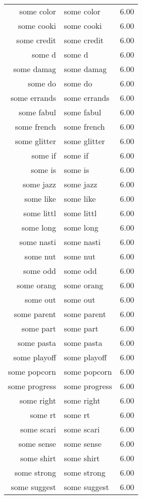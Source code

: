 \begin{table}[ht]
\begin{tabular}{rlr}
  some color & some color & 6.00 \\ 
  some cooki & some cooki & 6.00 \\ 
  some credit & some credit & 6.00 \\ 
  some d & some d & 6.00 \\ 
  some damag & some damag & 6.00 \\ 
  some do & some do & 6.00 \\ 
  some errands & some errands & 6.00 \\ 
  some fabul & some fabul & 6.00 \\ 
  some french & some french & 6.00 \\ 
  some glitter & some glitter & 6.00 \\ 
  some if & some if & 6.00 \\ 
  some is & some is & 6.00 \\ 
  some jazz & some jazz & 6.00 \\ 
  some like & some like & 6.00 \\ 
  some littl & some littl & 6.00 \\ 
  some long & some long & 6.00 \\ 
  some nasti & some nasti & 6.00 \\ 
  some nut & some nut & 6.00 \\ 
  some odd & some odd & 6.00 \\ 
  some orang & some orang & 6.00 \\ 
  some out & some out & 6.00 \\ 
  some parent & some parent & 6.00 \\ 
  some part & some part & 6.00 \\ 
  some pasta & some pasta & 6.00 \\ 
  some playoff & some playoff & 6.00 \\ 
  some popcorn & some popcorn & 6.00 \\ 
  some progress & some progress & 6.00 \\ 
  some right & some right & 6.00 \\ 
  some rt & some rt & 6.00 \\ 
  some scari & some scari & 6.00 \\ 
  some sense & some sense & 6.00 \\ 
  some shirt & some shirt & 6.00 \\ 
  some strong & some strong & 6.00 \\ 
  some suggest & some suggest & 6.00 \\ 

\end{tabular}
\end{table}
